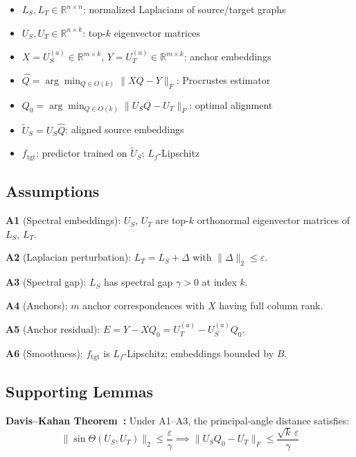 \documentclass[conference]{IEEEtran}
\begin{document}
\begin{itemize}
    \item $L_S, L_T \in \mathbb{R}^{n \times n}$: normalized Laplacians of source/target graphs
    \item $U_S, U_T \in \mathbb{R}^{n \times k}$: top-$k$ eigenvector matrices
    \item $X = U_S^{(a)} \in \mathbb{R}^{m \times k}$, $Y = U_T^{(a)} \in \mathbb{R}^{m \times k}$: anchor embeddings
    \item $\hat{Q} = \arg\min_{Q \in O(k)} \|XQ - Y\|_F$: Procrustes estimator
    \item $Q_0 = \arg\min_{Q \in O(k)} \|U_S Q - U_T\|_F$: optimal alignment
    \item $\tilde{U}_S = U_S \hat{Q}$: aligned source embeddings
    \item $f_{\text{tgt}}$: predictor trained on $\tilde{U}_S$; $L_f$-Lipschitz
\end{itemize}

\subsection{Assumptions}

\textbf{A1} (Spectral embeddings): $U_S$, $U_T$ are top-$k$ orthonormal eigenvector matrices of $L_S$, $L_T$.

\textbf{A2} (Laplacian perturbation): $L_T = L_S + \Delta$ with $\|\Delta\|_2 \leq \varepsilon$.

\textbf{A3} (Spectral gap): $L_S$ has spectral gap $\gamma > 0$ at index $k$.

\textbf{A4} (Anchors): $m$ anchor correspondences with $X$ having full column rank.

\textbf{A5} (Anchor residual): $E = Y - X Q_0 = U_T^{(a)} - U_S^{(a)} Q_0$.

\textbf{A6} (Smoothness): $f_{\text{tgt}}$ is $L_f$-Lipschitz; embeddings bounded by $B$.

\subsection{Supporting Lemmas}

\textbf{Davis--Kahan Theorem~\cite{davis1970}:} Under A1--A3, the principal-angle distance satisfies:
\begin{equation}
    \|\sin\Theta(U_S, U_T)\|_2 \leq \frac{\varepsilon}{\gamma} \implies \|U_S Q_0 - U_T\|_F \leq \frac{\sqrt{k}\,\varepsilon}{\gamma}
\end{equation}
\end{document}
